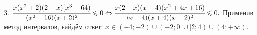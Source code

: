 3. $\cfrac{x(x^2+2)(2-x)(x^3-64)}{(x^2-16)(x+2)^2}\leqslant 0 \Leftrightarrow \cfrac{x(2-x)(x-4)(x^2+4x+16)}{(x-4)(x+4)(x+2)^2}\leqslant 0.$ Применив метод интервалов, найдём ответ: $x\in(-4;-2)\cup(-2;0]\cup[2;4)\cup(4;+\infty).$
\begin{figure}[ht!]
\end{figure}\\
